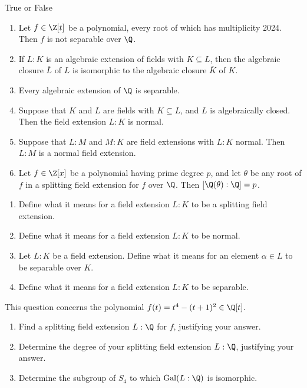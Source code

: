 \documentclass{article}
\begin{document}
\setcounter{section}{2}
 True or False
\begin{enumerate}[label=(\alph*)]
  \item Let \( f \in \Z[t] \) be a polynomial, every root of which has multiplicity 2024. Then \( f \) is not separable over \( \Q \).
  \item If \( L : K \) is an algebraic extension of fields with \( K \subseteq L \), then the algebraic closure \( \overline{L} \) of \( L \) is isomorphic to the algebraic closure \( \overline{K} \) of \( K \).
  \item Every algebraic extension of \( \Q \) is separable.
  \item Suppose that \( K \) and \( L \) are fields with \( K \subseteq L \), and \( L \) is algebraically closed. Then the field extension \( L : K \) is normal.
  \item Suppose that \( L : M \) and \( M : K \) are field extensions with \( L : K \) normal. Then \( L : M \) is a normal field extension.
  \item Let \( f \in \Z[x] \) be a polynomial having prime degree \( p \), and let \( \theta \) be any root of \( f \) in a splitting field extension for \( f \) over \( \Q \). Then \( [\Q(\theta) : \Q] = p \).
\end{enumerate}

\begin{enumerate}[label=(\alph*)]
  \item Define what it means for a field extension \( L : K \) to be a splitting field extension.
  \item Define what it means for a field extension \( L : K \) to be normal.
  \item Let \( L : K \) be a field extension. Define what it means for an element \( \alpha \in L \) to be separable over \( K \).
  \item Define what it means for a field extension \( L : K \) to be separable.
\end{enumerate}


 This question concerns the polynomial \( f(t) = t^4 - (t+1)^2 \in \Q[t] \).
\begin{enumerate}[label=(\alph*)]
  \item Find a splitting field extension \( L : \Q \) for \( f \), justifying your answer.
  \item Determine the degree of your splitting field extension \( L : \Q \), justifying your answer.
  \item Determine the subgroup of \( S_4 \) to which \( \mathrm{Gal}(L : \Q) \) is isomorphic.
\end{enumerate}
\end{document}
